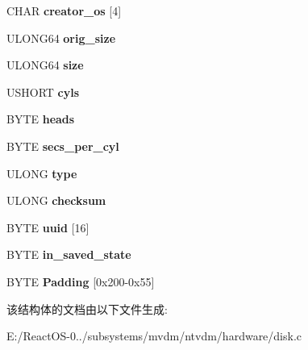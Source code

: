 \begin{DoxyCompactItemize}
\mbox{\label{struct___v_h_d___f_o_o_t_e_r_a326799f1a9d3608dc57f0d8dcb38f8fe}} 
C\+H\+AR {\bfseries creator\+\_\+os} \mbox{[}4\mbox{]}
\item 
\mbox{\label{struct___v_h_d___f_o_o_t_e_r_aa309e206264f5a2345d300aec0949591}} 
U\+L\+O\+N\+G64 {\bfseries orig\+\_\+size}
\item 
\mbox{\label{struct___v_h_d___f_o_o_t_e_r_a8195d6a12f7144bf6b33b826b55a1bd1}} 
U\+L\+O\+N\+G64 {\bfseries size}
\item 
\mbox{\label{struct___v_h_d___f_o_o_t_e_r_a397ac10d6f6378ff5ddd2e5ff12fb0d0}} 
U\+S\+H\+O\+RT {\bfseries cyls}
\item 
\mbox{\label{struct___v_h_d___f_o_o_t_e_r_abbf4893d047a1746066467e87ad08daf}} 
B\+Y\+TE {\bfseries heads}
\item 
\mbox{\label{struct___v_h_d___f_o_o_t_e_r_a438c199657bd1d0bd42d1efa301bfac5}} 
B\+Y\+TE {\bfseries secs\+\_\+per\+\_\+cyl}
\item 
\mbox{\label{struct___v_h_d___f_o_o_t_e_r_a87fac27ca36a384a749cd7421d81c24f}} 
U\+L\+O\+NG {\bfseries type}
\item 
\mbox{\label{struct___v_h_d___f_o_o_t_e_r_a6a5188b355b7ea72a761cd7e90a31c43}} 
U\+L\+O\+NG {\bfseries checksum}
\item 
\mbox{\label{struct___v_h_d___f_o_o_t_e_r_afa04897ff35e3c9c7f5a3ea20b471888}} 
B\+Y\+TE {\bfseries uuid} \mbox{[}16\mbox{]}
\item 
\mbox{\label{struct___v_h_d___f_o_o_t_e_r_af754d598ccbf4b8e78bc12c60d4a1df6}} 
B\+Y\+TE {\bfseries in\+\_\+saved\+\_\+state}
\item 
\mbox{\label{struct___v_h_d___f_o_o_t_e_r_a9e20b88531df9df4ba94d82bb62e8457}} 
B\+Y\+TE {\bfseries Padding} \mbox{[}0x200-\/0x55\mbox{]}
\end{DoxyCompactItemize}


该结构体的文档由以下文件生成\+:\begin{DoxyCompactItemize}
\item 
E\+:/\+React\+O\+S-\/0../subsystems/mvdm/ntvdm/hardware/disk.\+c\end{DoxyCompactItemize}

